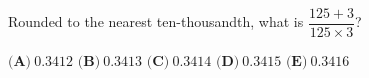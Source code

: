 Rounded to the nearest ten-thousandth, what is $\dfrac{125+3}{125\times3}$?

$\textbf{(A)}\ $$0.3412$ \qquad $\textbf{(B)}\ $$0.3413$ \qquad $\textbf{(C)}\ $$0.3414$ \qquad $\textbf{(D)}\ $$0.3415$ \qquad $\textbf{(E)}\ $$0.3416$
